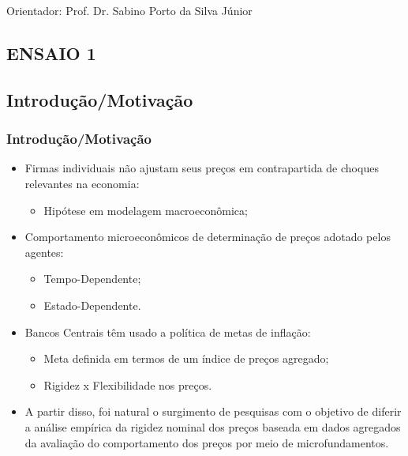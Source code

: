 \documentclass[aspectratio=169]{beamer}
\begin{document}
\begin{frame}
  \titlepage
Orientador: Prof. Dr. Sabino Porto da Silva Júnior
\end{frame}

\begin{frame}
\tableofcontents
\end{frame}

\begin{frame}
\section{ENSAIO 1}
\subsection{Introdução/Motivação}
\frametitle{Introdução/Motivação}
\begin{itemize}
\item Firmas individuais não ajustam seus preços em contrapartida de choques relevantes na economia:
  \begin{itemize}
  \item Hipótese em modelagem macroeconômica;
  \end{itemize}
\item Comportamento microeconômicos de determinação de preços adotado pelos agentes:
  \begin{itemize}
  \item Tempo-Dependente;
  \item Estado-Dependente.
  \end{itemize}
\item Bancos Centrais têm usado a política de metas de inflação:
  \begin{itemize}
  \item Meta definida em termos de um índice de preços agregado;
  \item Rigidez x Flexibilidade nos preços.
  \end{itemize}
\item A partir disso, foi natural o surgimento de pesquisas com o objetivo de diferir a análise empírica da rigidez nominal dos preços baseada em dados agregados da avaliação do comportamento dos preços por meio de microfundamentos.
\end{itemize}
\end{frame}
\end{document}
